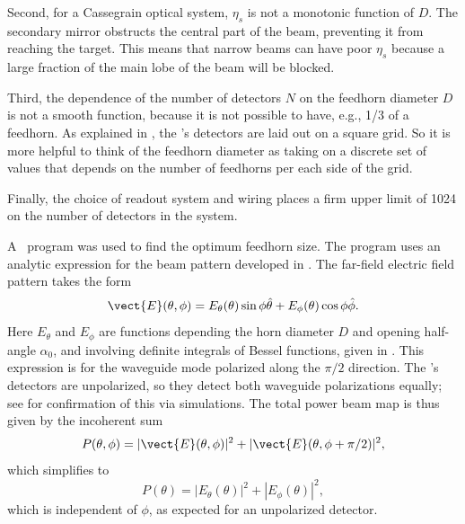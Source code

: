 Second, for a Cassegrain optical system, $\eta_s$ is not a monotonic function of $D$.
The secondary mirror obstructs the central part of the beam, preventing it from reaching the target.
This means that narrow beams can have poor $\eta_s$ because a large fraction of the main lobe of the beam will be blocked.

Third, the dependence of the number of detectors $N$ on the feedhorn diameter $D$ is not a smooth function, because it is not possible to have, e.g., 1/3 of a feedhorn.
As explained in , the \Imager's detectors are laid out on a square grid.
So it is more helpful to think of the feedhorn diameter as taking on a discrete set of values that depends on the number of feedhorns per each side of the grid.

Finally, the choice of readout system and wiring places a firm upper limit of \num{1024} on the number of detectors in the system.

A \MATLAB\ program was used to find the optimum feedhorn size.
The program uses an analytic expression for the beam pattern developed in \cite{green_radiation_2006,narasimhan_modes_1971,}.
The far-field electric field pattern takes the form
\begin{equation}
    \vect{E}(\theta,\phi) = E_{\theta}(\theta) \sin{\phi} \hat{\theta} + E_{\phi}(\theta) \cos{\phi} \hat{\phi}.
\end{equation}
Here $E_{\theta}$ and $E_{\phi}$ are functions depending the horn diameter $D$ and opening half-angle $\alpha_0$, and involving definite integrals of Bessel functions, given in \cite{green_radiation_2006,narasimhan_modes_1971}.
This expression is for the waveguide mode polarized along the $\pi/2$ direction.
The \Imager's detectors are unpolarized, so they detect both waveguide polarizations equally; see  for confirmation of this via simulations.
The total power beam map is thus given by the incoherent sum
\begin{equation}
    P(\theta, \phi) = |\vect{E}(\theta, \phi)|^2 + |\vect{E}(\theta, \phi+\pi/2)|^2,
\end{equation}
which simplifies to 
\begin{equation}
    P(\theta) = |E_{\theta}(\theta)|^2 + |E_{\phi}(\theta)|^2,
\end{equation}
which is independent of $\phi$, as expected for an unpolarized detector.

